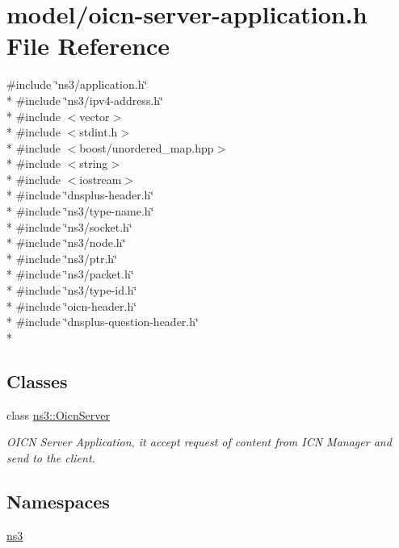 \hypertarget{oicn-server-application_8h}{\section{model/oicn-\/server-\/application.h File Reference}
\label{oicn-server-application_8h}
}
{\ttfamily \#include \char`\"{}ns3/application.\-h\char`\"{}}\\*
{\ttfamily \#include \char`\"{}ns3/ipv4-\/address.\-h\char`\"{}}\\*
{\ttfamily \#include $<$vector$>$}\\*
{\ttfamily \#include $<$stdint.\-h$>$}\\*
{\ttfamily \#include $<$boost/unordered\-\_\-map.\-hpp$>$}\\*
{\ttfamily \#include $<$string$>$}\\*
{\ttfamily \#include $<$iostream$>$}\\*
{\ttfamily \#include \char`\"{}dnsplus-\/header.\-h\char`\"{}}\\*
{\ttfamily \#include \char`\"{}ns3/type-\/name.\-h\char`\"{}}\\*
{\ttfamily \#include \char`\"{}ns3/socket.\-h\char`\"{}}\\*
{\ttfamily \#include \char`\"{}ns3/node.\-h\char`\"{}}\\*
{\ttfamily \#include \char`\"{}ns3/ptr.\-h\char`\"{}}\\*
{\ttfamily \#include \char`\"{}ns3/packet.\-h\char`\"{}}\\*
{\ttfamily \#include \char`\"{}ns3/type-\/id.\-h\char`\"{}}\\*
{\ttfamily \#include \char`\"{}oicn-\/header.\-h\char`\"{}}\\*
{\ttfamily \#include \char`\"{}dnsplus-\/question-\/header.\-h\char`\"{}}\\*
\subsection*{Classes}
\begin{DoxyCompactItemize}
\item 
class \hyperlink{classns3_1_1OicnServer}{ns3\-::\-Oicn\-Server}
\begin{DoxyCompactList}\small\item\em O\-I\-C\-N Server Application, it accept request of content from I\-C\-N Manager and send to the client. \end{DoxyCompactList}\end{DoxyCompactItemize}
\subsection*{Namespaces}
\begin{DoxyCompactItemize}
\item 
\hyperlink{namespacens3}{ns3}
\end{DoxyCompactItemize}
